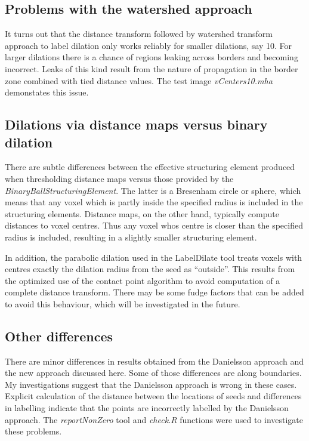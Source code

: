 \documentclass{InsightArticle}
\begin{document}
\subsection{Problems with the watershed approach}
It turns out that the distance transform followed by watershed
transform approach to label dilation only works reliably for smaller
dilations, say 10. For larger dilations there is a chance of regions
leaking across borders and becoming incorrect. Leaks of this kind
result from the nature of propagation in the border zone combined with
tied distance values. The test image {\em vCenters10.mha} demonstates
this issue.

\subsection{Dilations via distance maps versus binary dilation}
There are subtle differences between the effective structuring element
produced when thresholding distance maps versus those provided by the
{\em BinaryBallStructuringElement}. The latter is a Bresenham circle
or sphere, which means that any voxel which is partly inside the
specified radius is included in the structuring elements. Distance
maps, on the other hand, typically compute distances to voxel
centres. Thus any voxel whos centre is closer than the specified
radius is included, resulting in a slightly smaller structuring
element. 

In addition, the parabolic dilation used in the LabelDilate tool
treats voxels with centres exactly the dilation radius from the seed
as ``outside''. This results from the optimized use of the contact
point algorithm to avoid computation of a complete distance
transform. There may be some fudge factors that can be added to avoid
this behaviour, which will be investigated in the future.

\subsection{Other differences}
There are minor differences in results obtained from the Danielsson
approach and the new approach discussed here. Some of those
differences are along boundaries. My investigations suggest that the
Danielsson approach is wrong in these cases. Explicit calculation of
the distance between the locations of seeds and differences in
labelling indicate that the points are incorrectly labelled by the
Danielsson approach. The {\em reportNonZero} tool and {\em check.R}
functions were used to investigate these problems.
\end{document}

